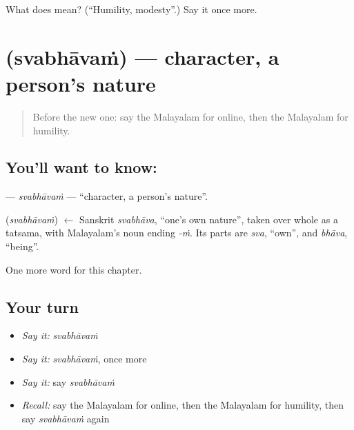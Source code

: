 \begin{tcolorbox}[breakable,colback=teal!4,colframe=teal!35!black,title={Before you move on}]
What does  mean? (\textquotedblleft{}Humility, modesty\textquotedblright{}.) Say it once more.
\end{tcolorbox}
\section[\texorpdfstring{\ml{സ്വഭാവം} (svabhāvaṁ)}{സ്വഭാവം (svabhāvaṁ)}]{ (svabhāvaṁ) — character, a person's nature}

\label{lesson:ML-C319-svabhavam}



\begin{quote}
Before the new one: say the Malayalam for online, then the Malayalam for humility.
\end{quote}

\subsection*{You'll want to know: }
\textbf{} — \emph{svabhāvaṁ} — \textquotedblleft{}character, a person's nature\textquotedblright{}.

\begin{cousinweb}
\textbf{} (\emph{svabhāvaṁ}) $\leftarrow$ Sanskrit \emph{svabhāva}, \textquotedblleft{}one's own nature\textquotedblright{}, taken over whole as a tatsama, with Malayalam's noun ending \emph{-ṁ}. Its parts are \emph{sva}, \textquotedblleft{}own\textquotedblright{}, and \emph{bhāva}, \textquotedblleft{}being\textquotedblright{}.
\end{cousinweb}

\begin{grammarlens}[title={What you've built}]
One more word for this chapter.
\end{grammarlens}

\subsection*{Your turn}
\begin{itemize}
\raggedright
  \item \emph{Say it:} \emph{svabhāvaṁ}
  \item \emph{Say it:} \emph{svabhāvaṁ}, once more
  \item \emph{Say it:} say \emph{svabhāvaṁ}
  \item \emph{Recall:} say the Malayalam for online, then the Malayalam for humility, then say \emph{svabhāvaṁ} again
\end{itemize}

